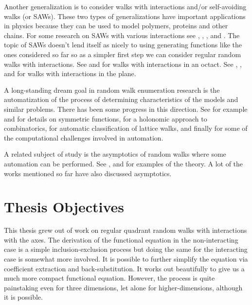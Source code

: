 Another generalization is to consider walks with interactions and/or self-avoiding walks (or SAWs). These two types of generalizations have important applications in physics because they can be used to model polymers, proteins and other chains. For some research on SAWs with various interactions see \cite{van2004multiple},\cite{brak2009self} \cite{chan2012monte}, \cite{bacher2011weakly}, \cite{bedini2014lattice} and \cite{dagrosa2015writhe}. The topic of SAWs doesn't lend itself as nicely to using generating functions like the ones considered so far so as a simpler first step we can consider regular random walks with interactions. See \cite{niederhausen2005random} and \cite{niederhausen2005note} for walks with interactions in an octact. See \cite{brak2005directed}, \cite{owczarek2012enumeration}, and \cite{tabbara2014exact} for walks with interactions in the plane.


A long-standing dream goal in random walk enumeration research is the automatization of the process of determining characteristics of the models and similar problems. There has been some progress in this direction. See for example \cite{gessel1990symmetric} and \cite{chyzak2005effective} for details on symmetric functions, \cite{mishna2005holonomic} for a holonomic approach to combinatorics, \cite{bostan2009automatic} for automatic classification of lattice walks, and finally \cite{kauers2011computational} for some of the computational challenges involved in automation.

A related subject of study is the asymptotics of random walks where some automation can be performed. See \cite{johnson2013towards}, \cite{melczer2014asymptotic} and \cite{melczer2014enumerating} for examples of the theory. A lot of the works mentioned so far have also discussed asymptotics.

\section{Thesis Objectives}

This thesis grew out of work on regular quadrant random walks with interactions with the axes. The derivation of the functional equation in the non-interacting case is a simple inclusion-exclusion process but doing the same for the interacting case is somewhat more involved. It is possible to further simplify the equation via coefficient extraction and back-substitution. It works out beautifully to give us a much more compact functional equation. However, the process is quite painstaking even for three dimensions, let alone for higher-dimensions, although it is possible. 


